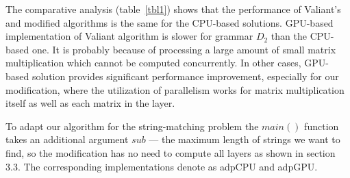 \begin{table*}[h]
\caption{Results of the comparison of Valiant's algorithm and the modification}
\label{tbl1}
\centering
{}
\end{table*}

The comparative analysis (table~\ref{tbl1}) shows that the performance of Valiant's and modified algorithms is the same for the CPU-based solutions.
GPU-based implementation of Valiant algorithm is slower for grammar $D_2$ than the CPU-based one. 
It is probably because of processing a large amount of small matrix multiplication which cannot be computed concurrently. 
In other cases, GPU-based solution provides significant performance improvement, especially for our modification, where the utilization of parallelism works for matrix multiplication itself as well as each matrix in the layer.

To adapt our algorithm for the string-matching problem the $main()$ function takes an additional argument $sub$ ---  the maximum length of strings we want to find, so the modification has no need to compute all layers as shown in section 3.3.
The corresponding implementations denote as  \textsf{adpCPU} and \textsf{adpGPU}.

